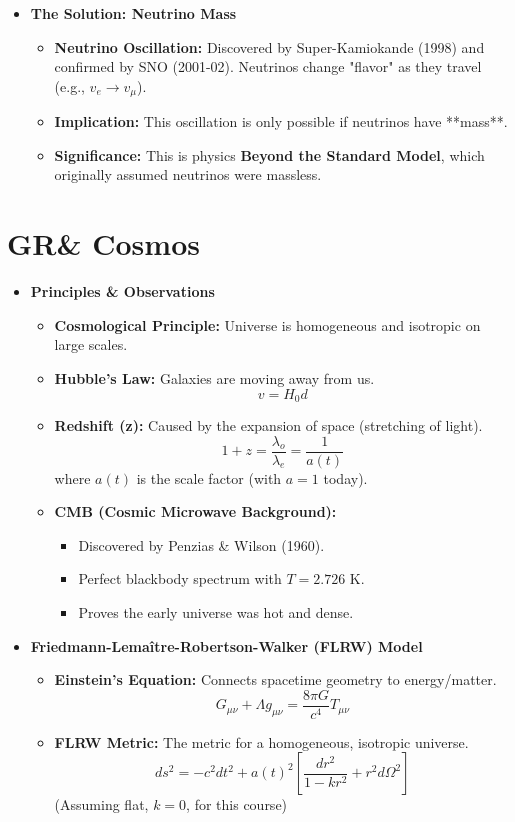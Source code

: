 \documentclass{sciposter}
\begin{document}
\begin{multicols}{3}
\begin{itemize}
    \item \textbf{The Solution: Neutrino Mass}
    \begin{itemize}
        \item \textbf{Neutrino Oscillation:} Discovered by Super-Kamiokande (1998) and confirmed by SNO (2001-02). Neutrinos change "flavor" as they travel (e.g., $v_e \rightarrow v_\mu$).
        \item \textbf{Implication:} This oscillation is only possible if neutrinos have **mass**.
        \item \textbf{Significance:} This is physics \textbf{Beyond the Standard Model}, which originally assumed neutrinos were massless.
    \end{itemize}
\end{itemize}

\section{GR\& Cosmos}


\begin{itemize}
    \item \textbf{Principles \& Observations}
    \begin{itemize}
        \item \textbf{Cosmological Principle:} Universe is homogeneous and isotropic on large scales.
        \item \textbf{Hubble's Law:} Galaxies are moving away from us.
        $$v = H_0 d$$
        \item \textbf{Redshift (z):} Caused by the expansion of space (stretching of light).
        $$1+z = \frac{\lambda_o}{\lambda_e} = \frac{1}{a(t)}$$
        where $a(t)$ is the scale factor (with $a=1$ today).
        \item \textbf{CMB (Cosmic Microwave Background):}
        \begin{itemize}
            \item Discovered by Penzias \& Wilson (1960).
            \item Perfect blackbody spectrum with $T = 2.726 \text{ K}$.
            \item Proves the early universe was hot and dense.
        \end{itemize}
    \end{itemize}

    \item \textbf{Friedmann-Lemaître-Robertson-Walker (FLRW) Model}
    \begin{itemize}
        \item \textbf{Einstein's Equation:} Connects spacetime geometry to energy/matter.
        $$G_{\mu\nu} + \Lambda g_{\mu\nu} = \frac{8\pi G}{c^{4}}T_{\mu\nu}$$
        \item \textbf{FLRW Metric:} The metric for a homogeneous, isotropic universe.
        $$ds^{2} = -c^{2}dt^{2} + a(t)^{2}\left[\frac{dr^{2}}{1-kr^{2}} + r^{2}d\Omega^{2}\right]$$
        (Assuming flat, $k=0$, for this course)
    \end{itemize}


\end{itemize}
\end{multicols}
\end{document}
